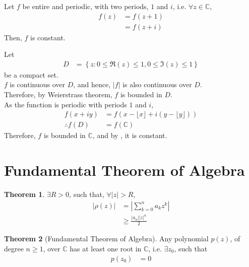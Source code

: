 \documentclass[titlepage, fleqn, a4paper, 12pt, twoside]{article}
\theoremstyle{definition}
\theoremstyle{theorem}
\newtheorem{theorem}{Theorem}
\begin{document}
\begin{question}
	Let $f$ be entire and periodic, with two periods, $1$ and $i$, i.e. $\forall z \in \mathbb{C}$,
	\begin{align*}
		f(z) & = f(z + 1) \\
                     & = f(z + i)
	\end{align*}
	Then, $f$ is constant.
\end{question}

\begin{solution}
	Let
	\begin{align*}
		D & = \left\{ z : 0 \le \Re(z) \le 1 , 0 \le \Im(z) \le 1 \right\}
	\end{align*}
	be a compact set.\\
	$f$ is continuous over $D$, and hence, $|f|$ is also continuous over $D$.\\
	Therefore, by Weierstrass theorem, $f$ is bounded in $D$.\\
	As the function is periodic with periods $1$ and $i$,
	\begin{align*}
		f(x + i y)      & = f\left( x - \lfloor x \rfloor + i \left( y - \lfloor y \rfloor \right) \right) \\
		\therefore f(D) & = f(\mathbb{C})
	\end{align*}
	Therefore, $f$ is bounded in $\mathbb{C}$, and by , it is constant.
\end{solution}

\section{Fundamental Theorem of Algebra}

\begin{theorem}
	$\exists R > 0$, such that, $\forall |z| > R$,
	\begin{align*}
		\left| \rho(z) \right| & = \left| \sum\limits_{k = 0}^{n} a_k z^k \right| \\
                                       & \ge \frac{|a_n| |z|^n}{2}
	\end{align*}
\end{theorem}

\begin{theorem}[Fundamental Theorem of Algebra]
	Any polynomial $p(z)$, of degree $n \ge 1$, over $\mathbb{C}$ has at least one root in $\mathbb{C}$, i.e. $\exists z_0$, such that
	\begin{align*}
		p(z_0) & = 0
	\end{align*}
	\label{thm:Fundamental_Theorem_of_Algebra}
\end{theorem}
\end{document}
